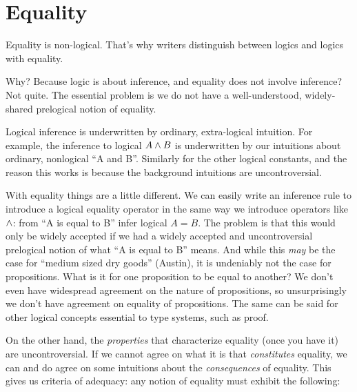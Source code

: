 \documentclass{article}
\begin{document}


\section{Equality}

Equality is non-logical. That's why writers distinguish between logics
and logics with equality.

Why? Because logic is about inference, and equality does not involve
inference? Not quite. The essential problem is we do not have a well-understood, widely-shared prelogical notion of equality.

Logical inference is underwritten by ordinary, extra-logical
intuition. For example, the inference to logical \(A\land B\) is
underwritten by our intuitions about ordinary, nonlogical ``A and B''.
Similarly for the other logical constants, and the reason this works
is because the background intuitions are uncontroversial.

With equality things are a little different. We can easily write an
inference rule to introduce a logical equality operator in the same
way we introduce operators like \(\land\): from ``A is equal to B''
infer logical \(A=B\). The problem is that this would only be widely
accepted if we had a widely accepted and uncontroversial prelogical
notion of what ``A is equal to B'' means. And while this \textit{may}
be the case for ``medium sized dry goods'' (Austin), it is undeniably
not the case for propositions. What is it for one proposition to be
equal to another? We don't even have widespread agreement on the
nature of propositions, so unsurprisingly we don't have agreement on
equality of propositions. The same can be said for other logical
concepts essential to type systems, such as proof.

On the other hand, the \textit{properties} that characterize equality
(once you have it) are uncontroversial. If we cannot agree on what it
is that \textit{constitutes} equality, we can and do agree on some
intuitions about the \textit{consequences} of equality. This gives us
criteria of adequacy: any notion of equality must exhibit the
following:
\end{document}
